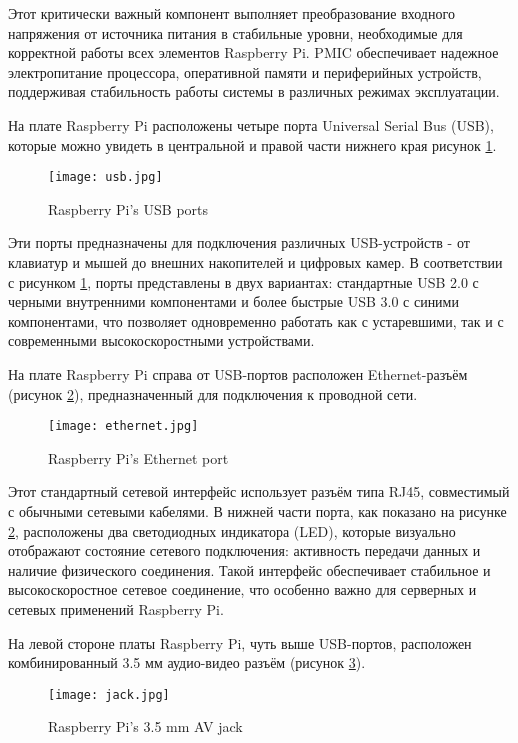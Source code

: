 Этот критически важный компонент выполняет преобразование входного напряжения от источника питания в стабильные уровни, необходимые для корректной работы всех элементов Raspberry Pi. PMIC обеспечивает надежное электропитание процессора, оперативной памяти и периферийных устройств, поддерживая стабильность работы системы в различных режимах эксплуатации.

На плате Raspberry Pi расположены четыре порта Universal Serial Bus (USB), которые можно увидеть в центральной и правой части нижнего края рисунок \ref{fig:usb}.

\begin{figure}[H]
	\centering
	\texttt{[image: usb.jpg]}
	\caption{Raspberry Pi’s USB ports}
	\label{fig:usb}
\end{figure}

Эти порты предназначены для подключения различных USB-устройств - от клавиатур и мышей до внешних накопителей и цифровых камер. В соответствии с рисунком \ref{fig:usb}, порты представлены в двух вариантах: стандартные USB 2.0 с черными внутренними компонентами и более быстрые USB 3.0 с синими компонентами, что позволяет одновременно работать как с устаревшими, так и с современными высокоскоростными устройствами.

На плате Raspberry Pi справа от USB-портов расположен Ethernet-разъём (рисунок \ref{fig:ethernet}), предназначенный для подключения к проводной сети.

\begin{figure}[H]
	\centering
	\texttt{[image: ethernet.jpg]}
	\caption{Raspberry Pi’s Ethernet port}
	\label{fig:ethernet}
\end{figure}

Этот стандартный сетевой интерфейс использует разъём типа RJ45, совместимый с обычными сетевыми кабелями. В нижней части порта, как показано на рисунке \ref{fig:ethernet}, расположены два светодиодных индикатора (LED), которые визуально отображают состояние сетевого подключения: активность передачи данных и наличие физического соединения. Такой интерфейс обеспечивает стабильное и высокоскоростное сетевое соединение, что особенно важно для серверных и сетевых применений Raspberry Pi.

На левой стороне платы Raspberry Pi, чуть выше USB-портов, расположен комбинированный 3.5 мм аудио-видео разъём (рисунок \ref{fig:jack}).

\begin{figure}[H]
	\centering
	\texttt{[image: jack.jpg]}
	\caption{Raspberry Pi’s 3.5 mm AV jack}
	\label{fig:jack}
\end{figure}

